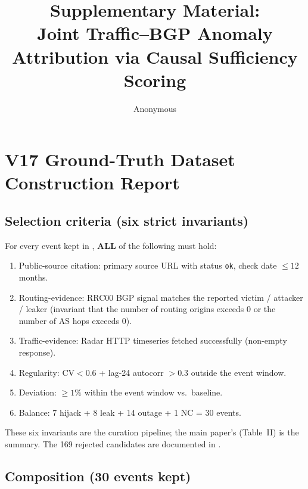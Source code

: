 \documentclass[sigcomm,nonatbib]{acmart}
\title{Supplementary Material:\\
Joint Traffic--BGP Anomaly Attribution via Causal Sufficiency Scoring}
\author{Anonymous}
\affiliation{%
 \institution{Anonymous Institution}
 \city{Anonymous}
 \state{XX}
 \country{Anon}
}
\newcommand{\rrc}{RRC00}
\begin{document}
\maketitle


\section{V17 Ground-Truth Dataset Construction Report}
\label{sec:s17--report}

\subsection{Selection criteria (six strict invariants)}
\label{sec:s17-criteria}

For every event kept in ,
\textbf{ALL} of the following must hold:

\begin{enumerate}
\itemsep0pt
\item Public-source citation: primary source URL with status
 \texttt{ok}, check date $\leq 12$ months.
\item Routing-evidence: \rrc{} BGP signal matches the reported
 victim / attacker / leaker (invariant that
 the number of routing origins exceeds 0 or
 the number of AS hops exceeds 0).
\item Traffic-evidence: \cf{} Radar HTTP timeseries fetched
 successfully (non-empty response).
\item Regularity: $\mathrm{CV}<0.6$ + lag-24 autocorr
 $>0.3$ outside the event window.
\item Deviation: $\geq 1\%$ within the event window
 vs.\ baseline.
\item Balance: 7 hijack + 8 leak + 14 outage + 1 NC = 30
 events.
\end{enumerate}

These six invariants are the curation pipeline; the main
paper's  (Table~II) is the
summary. The 169 rejected candidates are documented in
.

\subsection{Composition (30 events kept)}
\end{document}
